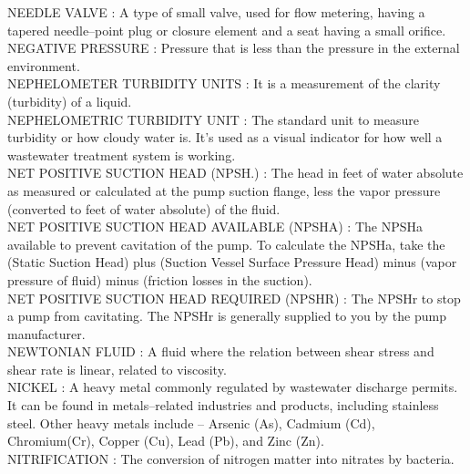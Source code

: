 \vspace{0.15cm}
NEEDLE VALVE :   A type of small valve, used for flow metering, having a tapered needle–point plug or closure element and a seat having a small orifice.\\
\vspace{0.15cm}
NEGATIVE PRESSURE :   Pressure that is less than the pressure in the external environment.\\
\vspace{0.15cm}
NEPHELOMETER TURBIDITY UNITS :   It is a measurement of the clarity (turbidity) of a liquid.\\
\vspace{0.15cm}
NEPHELOMETRIC TURBIDITY UNIT :   The standard unit to measure turbidity or how cloudy water is. It’s used as a visual indicator for how well a wastewater treatment system is working.\\
\vspace{0.15cm}
NET POSITIVE SUCTION HEAD (NPSH.) :   The head in feet of water absolute as measured or calculated at the pump suction flange, less the vapor pressure (converted to feet of water absolute) of the fluid.\\
\vspace{0.15cm}
NET POSITIVE SUCTION HEAD AVAILABLE (NPSHA) :   The NPSHa available to prevent cavitation of the pump. To calculate the NPSHa, take the (Static Suction Head) plus (Suction Vessel Surface Pressure Head) minus (vapor pressure of fluid) minus (friction losses in the suction).\\
\vspace{0.15cm}
NET POSITIVE SUCTION HEAD REQUIRED (NPSHR) :   The NPSHr to stop a pump from cavitating. The NPSHr is generally supplied to you by the pump manufacturer.\\
\vspace{0.15cm}
NEWTONIAN FLUID :   A fluid where the relation between shear stress and shear rate is linear, related to viscosity.\\
\vspace{0.15cm}
NICKEL :   A heavy metal commonly regulated by wastewater discharge permits. It can be found in metals–related industries and products, including stainless steel. Other heavy metals include – Arsenic (As), Cadmium (Cd), Chromium(Cr), Copper (Cu), Lead (Pb), and Zinc (Zn).\\
\vspace{0.15cm}
NITRIFICATION :   The conversion of nitrogen matter into nitrates by bacteria.\\
\vspace{0.15cm}
